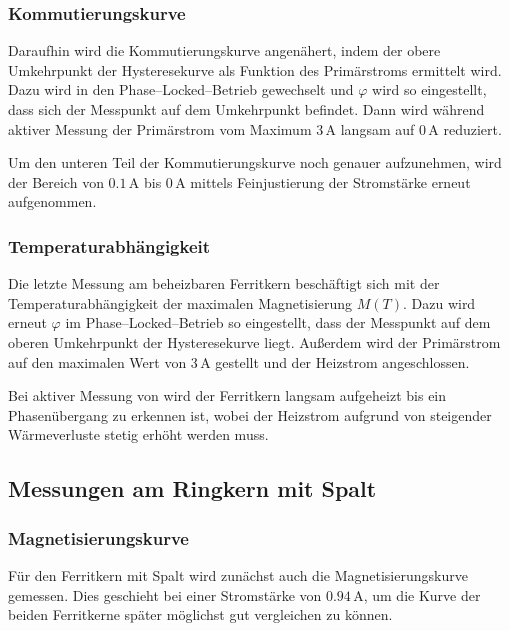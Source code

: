 \documentclass[12pt,a4paper]{scrartcl}
\numberwithin{equation}{section} %
\begin{document}
\hypertarget{kommutierungskurve}{%
\subsubsection{Kommutierungskurve}\label{kommutierungskurve}}
Daraufhin wird die Kommutierungskurve angenähert, indem der obere Umkehrpunkt der Hysteresekurve als Funktion des Primärstroms ermittelt wird. Dazu wird in den Phase--Locked--Betrieb gewechselt und $\varphi$ wird so eingestellt, dass sich der Messpunkt auf dem Umkehrpunkt befindet. Dann wird während aktiver Messung der Primärstrom vom Maximum $3\,\mathrm A$ langsam auf $0\,\mathrm A$ reduziert.

Um den unteren Teil der Kommutierungskurve noch genauer aufzunehmen, wird der Bereich von $0.1\,\mathrm A$ bis $0\,\mathrm A$ mittels Feinjustierung der Stromstärke erneut aufgenommen.

\hypertarget{temperaturabhuxe4ngigkeit}{%
\subsubsection{Temperaturabhängigkeit}\label{temperaturabhuxe4ngigkeit}}
Die letzte Messung am beheizbaren Ferritkern beschäftigt sich mit der Temperaturabhängigkeit der maximalen Magnetisierung $M(T)$. Dazu wird erneut $\varphi$ im Phase--Locked--Betrieb so eingestellt, dass der Messpunkt auf dem oberen Umkehrpunkt der Hysteresekurve liegt. Außerdem wird der Primärstrom auf den maximalen Wert von $3\,\mathrm A$ gestellt und der Heizstrom angeschlossen.

Bei aktiver Messung von wird der Ferritkern langsam aufgeheizt bis ein Phasenübergang zu erkennen ist, wobei der Heizstrom aufgrund von steigender Wärmeverluste stetig erhöht werden muss.

\hypertarget{messungen-am-ringkern-mit-spalt}{%
\subsection{Messungen am Ringkern mit Spalt}\label{messungen-am-ringkern-mit-spalt}}

\hypertarget{magnetisierungskurve-1}{%
\subsubsection{Magnetisierungskurve}\label{magnetisierungskurve-1}}

Für den Ferritkern mit Spalt wird zunächst auch die Magnetisierungskurve gemessen. Dies geschieht bei einer Stromstärke von $0.94\,\mathrm A$, um die Kurve der beiden Ferritkerne später möglichst gut vergleichen zu können.
\end{document}
